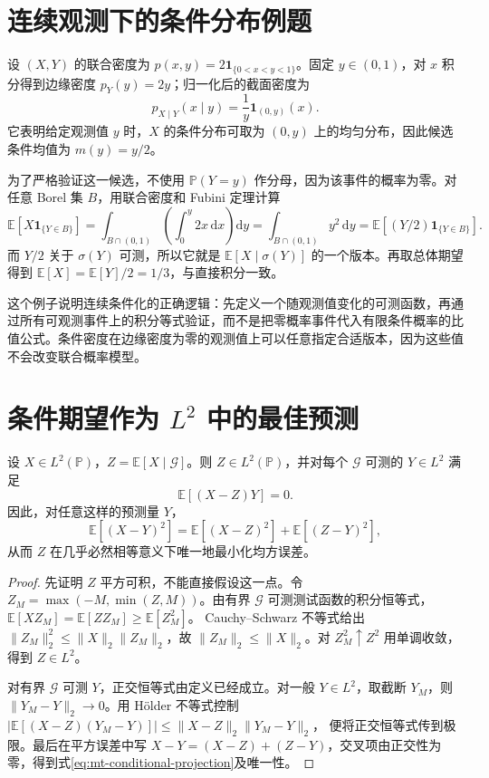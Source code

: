 \documentclass[UTF8,12pt,a4paper,fontset=fandol]{ctexbook}
\begin{document}
\section{连续观测下的条件分布例题}
\begin{example}[三角形区域上的联合密度]
设 $(X,Y)$ 的联合密度为 $p(x,y)=2\mathbf1_{\{0<x<y<1\}}$。固定 $y\in(0,1)$，对 $x$ 积分得到边缘密度 $p_Y(y)=2y$；归一化后的截面密度为
\[
 p_{X\mid Y}(x\mid y)=\frac1y\mathbf1_{(0,y)}(x).
\]
它表明给定观测值 $y$ 时，$X$ 的条件分布可取为 $(0,y)$ 上的均匀分布，因此候选条件均值为 $m(y)=y/2$。
\end{example}
为了严格验证这一候选，不使用 $\mathbb P(Y=y)$ 作分母，因为该事件的概率为零。对任意 Borel 集 $B$，用联合密度和 Fubini 定理计算
\[
 \mathbb E[X\mathbf1_{\{Y\in B\}}]
 =\int_{B\cap(0,1)}\left(\int_0^y2x\,\mathrm dx\right)\mathrm dy
 =\int_{B\cap(0,1)}y^2\,\mathrm dy
 =\mathbb E[(Y/2)\mathbf1_{\{Y\in B\}}].
\]
而 $Y/2$ 关于 $\sigma(Y)$ 可测，所以它就是 $\mathbb E[X\mid\sigma(Y)]$ 的一个版本。再取总体期望得到 $\mathbb E[X]=\mathbb E[Y]/2=1/3$，与直接积分一致。

这个例子说明连续条件化的正确逻辑：先定义一个随观测值变化的可测函数，再通过所有可观测事件上的积分等式验证，而不是把零概率事件代入有限条件概率的比值公式。条件密度在边缘密度为零的观测值上可以任意指定合适版本，因为这些值不会改变联合概率模型。

\section{条件期望作为 $L^2$ 中的最佳预测}
\begin{theorem}
设 $X\in L^2(\mathbb P)$，$Z=\mathbb E[X\mid\mathcal G]$。则 $Z\in L^2(\mathbb P)$，并对每个 $\mathcal G$ 可测的 $Y\in L^2$ 满足
\[
 \mathbb E[(X-Z)Y]=0.
\]
因此，对任意这样的预测量 $Y$，
\begin{equation}
 \mathbb E[(X-Y)^2]
 =\mathbb E[(X-Z)^2]+\mathbb E[(Z-Y)^2],
 \label{eq:mt-conditional-projection}
\end{equation}
从而 $Z$ 在几乎必然相等意义下唯一地最小化均方误差。
\label{thm:mt-conditional-projection}
\end{theorem}
\begin{proof}
先证明 $Z$ 平方可积，不能直接假设这一点。令 $Z_M=\max(-M,\min(Z,M))$。由有界 $\mathcal G$ 可测测试函数的积分恒等式，
$\mathbb E[XZ_M]=\mathbb E[ZZ_M]\geq\mathbb E[Z_M^2]$。
Cauchy--Schwarz 不等式给出
$\|Z_M\|_2^2\leq\|X\|_2\|Z_M\|_2$，故 $\|Z_M\|_2\leq\|X\|_2$。对 $Z_M^2\uparrow Z^2$ 用单调收敛，得到 $Z\in L^2$。

对有界 $\mathcal G$ 可测 $Y$，正交恒等式由定义已经成立。对一般 $Y\in L^2$，取截断 $Y_M$，则 $\|Y_M-Y\|_2\to0$。用 Hölder 不等式控制
$|\mathbb E[(X-Z)(Y_M-Y)]|\leq\|X-Z\|_2\|Y_M-Y\|_2$，
便将正交恒等式传到极限。最后在平方误差中写 $X-Y=(X-Z)+(Z-Y)$，交叉项由正交性为零，得到式\eqref{eq:mt-conditional-projection}及唯一性。
\end{proof}
\end{document}
